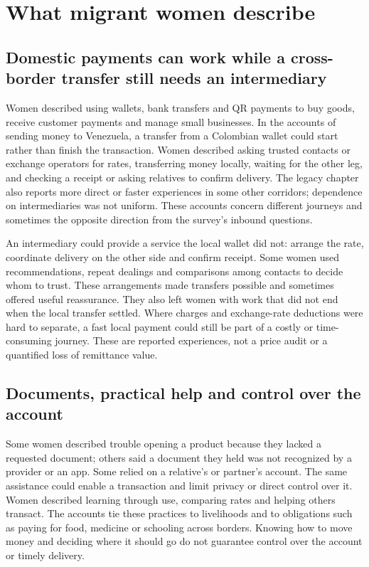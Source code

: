 \section{What migrant women describe}
\subsection{Domestic payments can work while a cross-border transfer still needs an intermediary}

Women described using wallets, bank transfers and QR payments to buy goods, receive customer payments and manage small businesses. In the accounts of sending money to Venezuela, a transfer from a Colombian wallet could start rather than finish the transaction. Women described asking trusted contacts or exchange operators for rates, transferring money locally, waiting for the other leg, and checking a receipt or asking relatives to confirm delivery. The legacy chapter also reports more direct or faster experiences in some other corridors; dependence on intermediaries was not uniform. These accounts concern different journeys and sometimes the opposite direction from the survey's inbound questions.

An intermediary could provide a service the local wallet did not: arrange the rate, coordinate delivery on the other side and confirm receipt. Some women used recommendations, repeat dealings and comparisons among contacts to decide whom to trust. These arrangements made transfers possible and sometimes offered useful reassurance. They also left women with work that did not end when the local transfer settled. Where charges and exchange-rate deductions were hard to separate, a fast local payment could still be part of a costly or time-consuming journey. These are reported experiences, not a price audit or a quantified loss of remittance value.

\subsection{Documents, practical help and control over the account}

Some women described trouble opening a product because they lacked a requested document; others said a document they held was not recognized by a provider or an app. Some relied on a relative's or partner's account. The same assistance could enable a transaction and limit privacy or direct control over it. Women described learning through use, comparing rates and helping others transact. The accounts tie these practices to livelihoods and to obligations such as paying for food, medicine or schooling across borders. Knowing how to move money and deciding where it should go do not guarantee control over the account or timely delivery.


